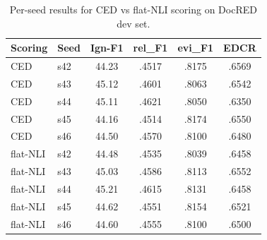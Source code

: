 \documentclass[11pt,a4paper]{article}
\begin{document}
\begin{table}[h]
\centering
\small
\begin{tabular}{llcccc}
\toprule
\textbf{Scoring} & \textbf{Seed} & \textbf{Ign-F1} & \textbf{rel\_F1} & \textbf{evi\_F1} & \textbf{EDCR} \\
\midrule
CED & s42 & 44.23 & .4517 & .8175 & .6569 \\
CED & s43 & 45.12 & .4601 & .8063 & .6542 \\
CED & s44 & 45.11 & .4621 & .8050 & .6350 \\
CED & s45 & 44.16 & .4514 & .8174 & .6550 \\
CED & s46 & 44.50 & .4570 & .8100 & .6480 \\
\midrule
flat-NLI & s42 & 44.48 & .4535 & .8039 & .6458 \\
flat-NLI & s43 & 45.03 & .4586 & .8113 & .6552 \\
flat-NLI & s44 & 45.21 & .4615 & .8131 & .6458 \\
flat-NLI & s45 & 44.62 & .4551 & .8154 & .6521 \\
flat-NLI & s46 & 44.60 & .4555 & .8100 & .6500 \\
\bottomrule
\end{tabular}
\caption{Per-seed results for CED vs flat-NLI scoring on DocRED dev set.}
\label{tab:per-seed}
\end{table}
\end{document}
